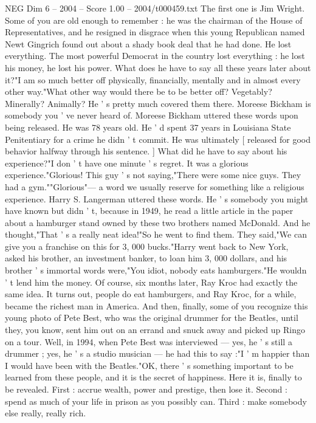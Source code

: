 \begin{textsample}{NEG Dim 6 – 2004 – Score 1.00 – 2004/t000459.txt}
The first one is Jim Wright.
Some of you are old enough to remember : he was the chairman of the House of Representatives, and he resigned in disgrace when this young Republican named Newt Gingrich found out about a shady book deal that he had done.
He lost everything.
The most powerful Democrat in the country lost everything : he lost his money, he lost his power.
What does he have to say all these years later about it?"I am so much better off physically, financially, mentally and in almost every other way."What other way would there be to be better off?
Vegetably?
Minerally?
Animally?
He ' s pretty much covered them there.
Moreese Bickham is somebody you ' ve never heard of.
Moreese Bickham uttered these words upon being released.
He was 78 years old.
He ' d spent 37 years in Louisiana State Penitentiary for a crime he didn ' t commit.
He was ultimately [ released for good behavior halfway through his sentence. ] What did he have to say about his experience?"I don ' t have one minute ' s regret.
It was a glorious experience."Glorious!
This guy ' s not saying,"There were some nice guys.
They had a gym.""Glorious"— a word we usually reserve for something like a religious experience.
Harry S.
Langerman uttered these words.
He ' s somebody you might have known but didn ' t, because in 1949, he read a little article in the paper about a hamburger stand owned by these two brothers named McDonald.
And he thought,"That ' s a really neat idea!"So he went to find them.
They said,"We can give you a franchise on this for 3, 000 bucks."Harry went back to New York, asked his brother, an investment banker, to loan him 3, 000 dollars, and his brother ' s immortal words were,"You idiot, nobody eats hamburgers."He wouldn ' t lend him the money.
Of course, six months later, Ray Kroc had exactly the same idea.
It turns out, people do eat hamburgers, and Ray Kroc, for a while, became the richest man in America.
And then, finally, some of you recognize this young photo of Pete Best, who was the original drummer for the Beatles, until they, you know, sent him out on an errand and snuck away and picked up Ringo on a tour.
Well, in 1994, when Pete Best was interviewed — yes, he ' s still a drummer ; yes, he ' s a studio musician — he had this to say :"I ' m happier than I would have been with the Beatles."OK, there ' s something important to be learned from these people, and it is the secret of happiness.
Here it is, finally to be revealed.
First : accrue wealth, power and prestige, then lose it.
Second : spend as much of your life in prison as you possibly can.
Third : make somebody else really, really rich.

\end{textsample}
